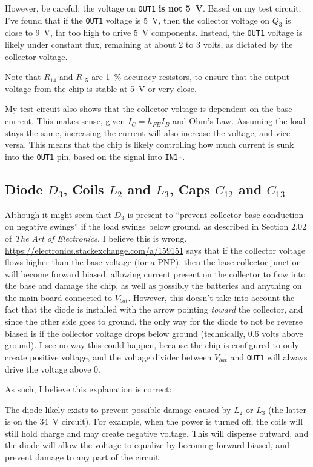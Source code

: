\documentclass{article}
\newcommand{\Vbat}{$V_{bat}$}
\newcommand{\chippin}{\texttt}
\begin{document}
However, be careful: the voltage on \chippin{OUT1} \textbf{is not
  \qty{5}{\volt}}. Based on my test circuit, I've found that if the
\chippin{OUT1} voltage is \qty{5}{\volt}, then the collector voltage
on $Q_3$ is close to \qty{9}{\volt}, far too high to drive
\qty{5}{\volt} components. Instead, the \chippin{OUT1} voltage is
likely under constant flux, remaining at about 2 to 3 volts, as
dictated by the collector voltage.

Note that $R_{14}$ and $R_{15}$ are \qty{1}{\%} accuracy resistors, to
ensure that the output voltage from the chip is stable at
\qty{5}{\volt} or very close.

My test circuit also shows that the collector voltage is dependent on
the base current. This makes sense, given $I_C = h_{FE}I_B$ and Ohm's
Law. Assuming the load stays the same, increasing the current will
also increase the voltage, and vice versa. This means that the chip is
likely controlling how much current is sunk into the \chippin{OUT1}
pin, based on the signal into \chippin{IN1+}.

\subsection{Diode $D_3$, Coils $L_2$ and $L_3$, Caps $C_{12}$ and
  $C_{13}$}
Although it might seem that $D_3$ is present to ``prevent
collector-base conduction on negative swings'' if the load swings
below ground, as described in Section 2.02 of \textit{The Art of
  Electronics}, I believe this is
wrong. \url{https://electronics.stackexchange.com/a/159151} says that
if the collector voltage flows higher than the base voltage (for a
PNP), then the base-collector junction will become forward biased,
allowing current present on the collector to flow into the base and
damage the chip, as well as possibly the batteries and anything on the
main board connected to \Vbat. However, this doesn't take into account
the fact that the diode is installed with the arrow pointing
\emph{toward} the collector, and since the other side goes to ground,
the only way for the diode to not be reverse biased is if the
collector voltage drops below ground (technically, 0.6 volts above
ground). I see no way this could happen, because the chip is
configured to only create positive voltage, and the voltage divider
between \Vbat{} and \chippin{OUT1} will always drive the voltage above
0.

As such, I believe this explanation is correct:

The diode likely exists to prevent possible damage caused by $L_2$ or
$L_3$ (the latter is on the \qty{34}{\volt} circuit). For example,
when the power is turned off, the coils will still hold charge and may
create negative voltage. This will disperse outward, and the diode
will allow the voltage to equalize by becoming forward biased, and
prevent damage to any part of the circuit.
\end{document}
